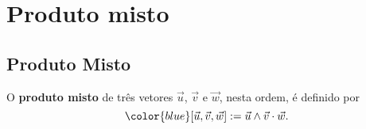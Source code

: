 

\chapter{Produto misto}\label{cap_prodmisto}
\badgeRevisar

\section{Produto Misto}\label{cap_prodmisto_sec_defn}
\badgeRevisar

O {\bf produto misto} de três vetores $\vec{u}$, $\vec{v}$ e $\vec{w}$, nesta ordem, é definido por
\begin{equation}
  {\color{blue}[\vec{u},\vec{v},\vec{w}] := \vec{u}\land\vec{v}\cdot\vec{w}}.
\end{equation}


